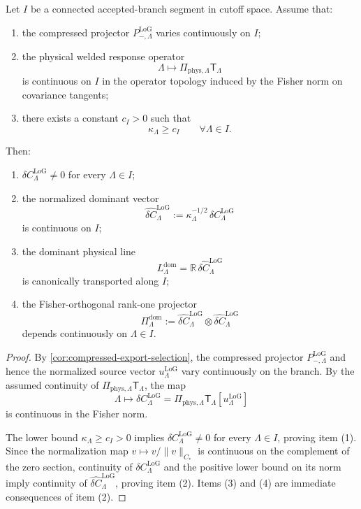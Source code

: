 \documentclass[11pt]{article}
\begin{document}
\begin{theorem}
\label{thm:dominant-line-persistence}
Let \(I\) be a connected accepted-branch segment in cutoff space.
Assume that:
\begin{enumerate}[leftmargin=2em]
\item the compressed projector \(P_{-,\Lambda}^{\mathrm{LoG}}\) varies continuously on \(I\);
\item the physical welded response operator
  \[
  \Lambda\longmapsto \Pi_{\mathrm{phys},\Lambda}\mathsf T_{\Lambda}
  \]
  is continuous on \(I\) in the operator topology induced by the Fisher norm on covariance
  tangents;
\item there exists a constant \(c_I>0\) such that
  \[
  \kappa_{\Lambda}\ge c_I
  \qquad
  \forall \Lambda\in I.
  \]
\end{enumerate}
Then:
\begin{enumerate}[leftmargin=2em]
\item \(\delta C^{\mathrm{LoG}}_{\Lambda}\neq 0\) for every \(\Lambda\in I\);
\item the normalized dominant vector
  \[
  \widehat{\delta C}^{\mathrm{LoG}}_{\Lambda}
  :=
  \kappa_{\Lambda}^{-1/2}\,\delta C^{\mathrm{LoG}}_{\Lambda}
  \]
  is continuous on \(I\);
\item the dominant physical line
  \[
  L^{\mathrm{dom}}_{\Lambda}
  =
  \mathbb R\,\widehat{\delta C}^{\mathrm{LoG}}_{\Lambda}
  \]
  is canonically transported along \(I\);
\item the Fisher-orthogonal rank-one projector
  \[
  \Pi^{\mathrm{dom}}_{\Lambda}
  :=
  \widehat{\delta C}^{\mathrm{LoG}}_{\Lambda}
  \otimes
  \widehat{\delta C}^{\mathrm{LoG}}_{\Lambda}
  \]
  depends continuously on \(\Lambda\in I\).
\end{enumerate}
\end{theorem}

\begin{proof}
By \cref{cor:compressed-export-selection}, the compressed projector
\(
P_{-,\Lambda}^{\mathrm{LoG}}
\)
and hence the normalized source vector \(u^{\mathrm{LoG}}_{\Lambda}\) vary continuously on the branch.
By the assumed continuity of \(\Pi_{\mathrm{phys},\Lambda}\mathsf T_{\Lambda}\), the map
\[
\Lambda\longmapsto
\delta C^{\mathrm{LoG}}_{\Lambda}
=
\Pi_{\mathrm{phys},\Lambda}\mathsf T_{\Lambda}[u^{\mathrm{LoG}}_{\Lambda}]
\]
is continuous in the Fisher norm.

The lower bound \(\kappa_{\Lambda}\ge c_I>0\) implies
\(
\delta C^{\mathrm{LoG}}_{\Lambda}\neq 0
\)
for every \(\Lambda\in I\), proving item (1).
Since the normalization map \(v\mapsto v/\|v\|_{C_\ast}\) is continuous on the complement of the
zero section, continuity of \(\delta C^{\mathrm{LoG}}_{\Lambda}\) and the positive lower bound on its
norm imply continuity of \(\widehat{\delta C}^{\mathrm{LoG}}_{\Lambda}\), proving item (2).
Items (3) and (4) are immediate consequences of item (2).
\end{proof}
\end{document}
